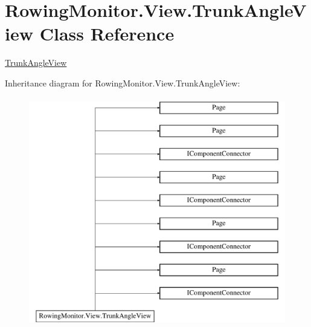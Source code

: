 \hypertarget{class_rowing_monitor_1_1_view_1_1_trunk_angle_view}{}\section{Rowing\+Monitor.\+View.\+Trunk\+Angle\+View Class Reference}
\label{class_rowing_monitor_1_1_view_1_1_trunk_angle_view}


\hyperlink{class_rowing_monitor_1_1_view_1_1_trunk_angle_view}{Trunk\+Angle\+View}  


Inheritance diagram for Rowing\+Monitor.\+View.\+Trunk\+Angle\+View\+:\begin{figure}[H]
\begin{center}
\leavevmode
\includegraphics[height=10.000000cm]{class_rowing_monitor_1_1_view_1_1_trunk_angle_view}
\end{center}
\end{figure}
